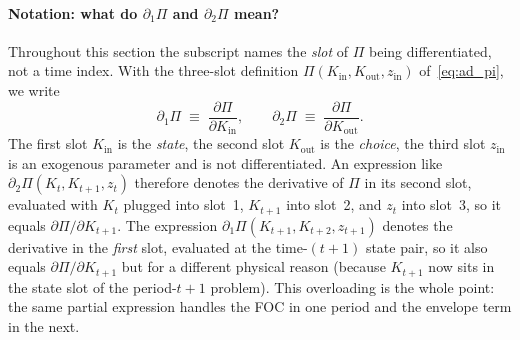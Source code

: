 \documentclass[11pt,a4paper]{report}
\begin{document}
\paragraph{Notation: what do $\partial_1\Pi$ and $\partial_2\Pi$ mean?}  Throughout this section the subscript names the \emph{slot} of $\Pi$ being differentiated, not a time index.  With the three-slot definition $\Pi(K_{\text{in}},K_{\text{out}},z_{\text{in}})$ of~\eqref{eq:ad_pi}, we write
\[
\partial_1\Pi \;\equiv\; \frac{\partial\Pi}{\partial K_{\text{in}}}, \qquad \partial_2\Pi \;\equiv\; \frac{\partial\Pi}{\partial K_{\text{out}}}.
\]
The first slot $K_{\text{in}}$ is the \emph{state}, the second slot $K_{\text{out}}$ is the \emph{choice}, the third slot $z_{\text{in}}$ is an exogenous parameter and is not differentiated.  An expression like $\partial_2\Pi(K_t,K_{t+1},z_t)$ therefore denotes the derivative of $\Pi$ in its second slot, evaluated with $K_t$ plugged into slot~1, $K_{t+1}$ into slot~2, and $z_t$ into slot~3, so it equals $\partial\Pi/\partial K_{t+1}$.  The expression $\partial_1\Pi(K_{t+1},K_{t+2},z_{t+1})$ denotes the derivative in the \emph{first} slot, evaluated at the time-$(t+1)$ state pair, so it also equals $\partial\Pi/\partial K_{t+1}$ but for a different physical reason (because $K_{t+1}$ now sits in the state slot of the period-$t+1$ problem).  This overloading is the whole point: the same partial expression handles the FOC in one period and the envelope term in the next.
\end{document}
